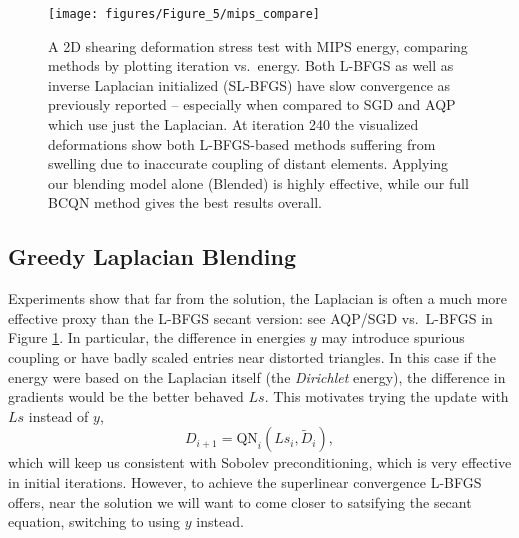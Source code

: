 \begin{figure}[h!]
\centering
\texttt{[image: figures/Figure\_5/mips\_compare]}
\caption{A 2D shearing deformation stress
test with MIPS energy, comparing methods by plotting iteration vs.\ energy. Both L-BFGS 
as well as inverse Laplacian initialized (SL-BFGS) have slow convergence as previously
reported -- especially when compared to SGD and AQP which use just
the Laplacian. 
At iteration 240 the visualized deformations show both L-BFGS-based methods suffering from
swelling due to inaccurate coupling of distant elements.
Applying our blending model alone (Blended) is highly
effective, while our full BCQN method gives the best results overall.}
\label{fig:quadratic_compare}
\end{figure}

\subsection{Greedy Laplacian Blending}

Experiments show that far from the solution, the Laplacian is often a much
more effective proxy than the L-BFGS secant version: see AQP/SGD vs.\ L-BFGS in Figure \ref{fig:quadratic_compare}.
In particular, the difference in energies $y$ may introduce spurious coupling or
have badly scaled entries near distorted triangles. In this
case if the energy were based on the Laplacian itself (the 
\emph{Dirichlet} energy), the difference in gradients would be the better
behaved $Ls$. This motivates trying the update with $Ls$ instead of $y$,
\begin{equation}
\label{eq:qn_L}
D_{i+1} = \mathrm{QN}_i(L s_i, \tilde{D}_i),
\end{equation}
which will keep us consistent with Sobolev preconditioning, which is very effective
in initial iterations. However, to achieve the
superlinear convergence L-BFGS offers, near the solution we will want
to come closer to satsifying the secant equation, switching to using $y$ instead.

